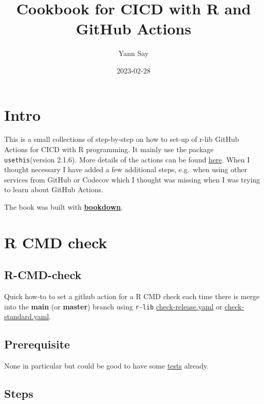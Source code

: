 \documentclass[
]{book}
\title{Cookbook for CICD with R and GitHub Actions}
\author{Yann Say}
\date{2023-02-28}
\begin{document}
\maketitle

{
\setcounter{tocdepth}{1}
\tableofcontents
}
\hypertarget{intro}{%
\chapter{Intro}\label{intro}}

This is a small collections of step-by-step on how to set-up of r-lib GitHub Actions for CICD with R programming. It mainly use the package \texttt{usethis}(version 2.1.6). More details of the actions can be found \href{https://github.com/r-lib/actions/tree/v2-branch/examples}{here}. When I thought necessary I have added a few additional steps, e.g.~when using other services from GitHub or Codecov which I thought was missing when I was trying to learn about GitHub Actions.

The book was built with \href{https://github.com/rstudio/bookdown}{\textbf{bookdown}}.

\hypertarget{r-cmd-check}{%
\chapter{R CMD check}\label{r-cmd-check}}

\hypertarget{r-cmd-check-1}{%
\section{R-CMD-check}\label{r-cmd-check-1}}

Quick how-to to set a github action for a R CMD check each time there is merge into the \textbf{main} (or \textbf{master}) branch using \texttt{r-lib} \href{https://github.com/r-lib/actions/blob/v2-branch/examples/check-release.yaml}{check-release.yaml} or \href{https://github.com/r-lib/actions/blob/v2-branch/examples/check-standard.yaml}{check-standard.yaml}.

\hypertarget{prerequisite}{%
\section{Prerequisite}\label{prerequisite}}

None in particular but could be good to have some \href{https://r-pkgs.org/testing-basics.html}{tests} already.

\hypertarget{steps}{%
\section{Steps}\label{steps}}
\end{document}
